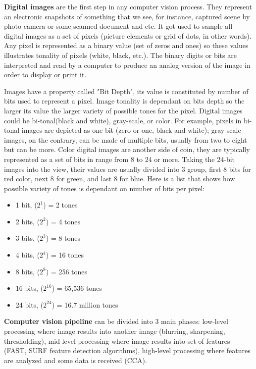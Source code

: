 \documentclass[../../../../main]{subfiles}
\begin{document}
\textbf{Digital images} are the first step in any computer vision process. They represent an electronic snapshots of something that we see, for instance, captured scene by photo camera or some scanned document and etc. It got used to sample all digital images as a set of pixels (picture elements or grid of dots, in other words). Any pixel is represented as a binary value (set of zeros and ones) so these values illustrates tonality of pixels (white, black, etc.). The binary digits or bits are interpreted and read by a computer to produce an analog version of the image in order to display or print it.

Images have a property called "Bit Depth", its value is constituted by number of bits used to represent a pixel. Image tonality is dependant on bits depth so the larger its value the larger variety of possible tones for the pixel. Digital images could be bi-tonal(black and white), gray-scale, or color. For example, pixels in bi-tonal images are depicted as one bit (zero or one, black and white); gray-scale images, on the contrary, can be made of multiple bits, usually from two to eight but can be more. Color digital images are another side of coin, they are typically represented as a set of bits in range from 8 to 24 or more. Taking the 24-bit images into the view, their values are usually divided into 3 group, first 8 bits for red color, next 8 for green, and last 8 for blue.
Here is a list that shows how possible variety of tones is dependant on number of bits per pixel:

\begin{itemize}
    \item 1 bit, ($2^1$) = 2 tones
    \item 2 bits, ($2^2$) = 4 tones
    \item 3 bits, ($2^3$) = 8 tones
    \item 4 bits, ($2^4$) = 16 tones
    \item 8 bits, ($2^8$) = 256 tones
    \item 16 bits, ($2^{16}$) = 65,536 tones
    \item 24 bits, ($2^{24}$) = 16.7 million tones
\end{itemize}

\textbf{Computer vision pipeline} can be divided into 3 main phases: low-level processing where image results into another image (blurring, sharpening, thresholding), mid-level processing where image results into set of features (\ac{FAST}, \ac{SURF} feature detection algorithms), high-level processing where features are analyzed and some data is received (\ac{CCA}). 
\end{document}
